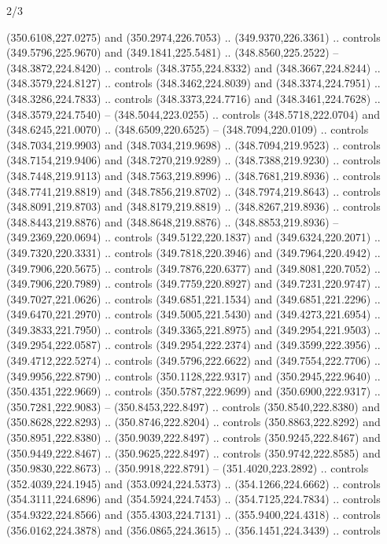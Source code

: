 \begin{flagdescription}{2/3}
\begin{scope}[xshift=0.5\flaglength,yshift=0.5\flagwidth,scale=\flagwidth/495.65]
\begin{scope}[y=0.8pt, x=0.8pt, yscale=-1,shift={(-463.76,-309.78)}]
  (350.6108,227.0275) and (350.2974,226.7053) .. (349.9370,226.3361) .. controls
  (349.5796,225.9670) and (349.1841,225.5481) .. (348.8560,225.2522) --
  (348.3872,224.8420) .. controls (348.3755,224.8332) and (348.3667,224.8244) ..
  (348.3579,224.8127) .. controls (348.3462,224.8039) and (348.3374,224.7951) ..
  (348.3286,224.7833) .. controls (348.3373,224.7716) and (348.3461,224.7628) ..
  (348.3579,224.7540) -- (348.5044,223.0255) .. controls (348.5718,222.0704) and
  (348.6245,221.0070) .. (348.6509,220.6525) -- (348.7094,220.0109) .. controls
  (348.7034,219.9903) and (348.7034,219.9698) .. (348.7094,219.9523) .. controls
  (348.7154,219.9406) and (348.7270,219.9289) .. (348.7388,219.9230) .. controls
  (348.7448,219.9113) and (348.7563,219.8996) .. (348.7681,219.8936) .. controls
  (348.7741,219.8819) and (348.7856,219.8702) .. (348.7974,219.8643) .. controls
  (348.8091,219.8703) and (348.8179,219.8819) .. (348.8267,219.8936) .. controls
  (348.8443,219.8876) and (348.8648,219.8876) .. (348.8853,219.8936) --
  (349.2369,220.0694) .. controls (349.5122,220.1837) and (349.6324,220.2071) ..
  (349.7320,220.3331) .. controls (349.7818,220.3946) and (349.7964,220.4942) ..
  (349.7906,220.5675) .. controls (349.7876,220.6377) and (349.8081,220.7052) ..
  (349.7906,220.7989) .. controls (349.7759,220.8927) and (349.7231,220.9747) ..
  (349.7027,221.0626) .. controls (349.6851,221.1534) and (349.6851,221.2296) ..
  (349.6470,221.2970) .. controls (349.5005,221.5430) and (349.4273,221.6954) ..
  (349.3833,221.7950) .. controls (349.3365,221.8975) and (349.2954,221.9503) ..
  (349.2954,222.0587) .. controls (349.2954,222.2374) and (349.3599,222.3956) ..
  (349.4712,222.5274) .. controls (349.5796,222.6622) and (349.7554,222.7706) ..
  (349.9956,222.8790) .. controls (350.1128,222.9317) and (350.2945,222.9640) ..
  (350.4351,222.9669) .. controls (350.5787,222.9699) and (350.6900,222.9317) ..
  (350.7281,222.9083) -- (350.8453,222.8497) .. controls (350.8540,222.8380) and
  (350.8628,222.8293) .. (350.8746,222.8204) .. controls (350.8863,222.8292) and
  (350.8951,222.8380) .. (350.9039,222.8497) .. controls (350.9245,222.8467) and
  (350.9449,222.8467) .. (350.9625,222.8497) .. controls (350.9742,222.8585) and
  (350.9830,222.8673) .. (350.9918,222.8791) -- (351.4020,223.2892) .. controls
  (352.4039,224.1945) and (353.0924,224.5373) .. (354.1266,224.6662) .. controls
  (354.3111,224.6896) and (354.5924,224.7453) .. (354.7125,224.7834) .. controls
  (354.9322,224.8566) and (355.4303,224.7131) .. (355.9400,224.4318) .. controls
  (356.0162,224.3878) and (356.0865,224.3615) .. (356.1451,224.3439) .. controls

\end{scope}
\end{scope}
\end{flagdescription}
